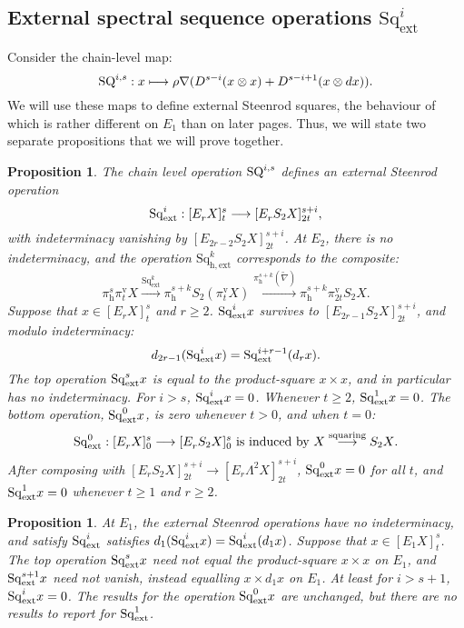 \documentclass[11pt]{amsart} \renewcommand{\baselinestretch}{1.4}
\theoremstyle{plain}
\newtheorem{prop}[thm]{Proposition}
\theoremstyle{definition}
\renewcommand{\to}{\longrightarrow}
\newcommand{\ExtCohOp}{\mathrm{Sq}_\mathrm{ext}}
\newcommand{\hExtCohOp}{\mathrm{Sq}_\mathrm{h,ext}}
\newcommand{\Nabla}{\nabla}
\newcommand{\Sq}{\mathrm{Sq}}
\newcommand{\Edownup}[5]{[E_{#1}^{#2}#3]^{#4}_{#5}}
\newcommand{\uver}{^\mathrm{v}}
\newcommand{\dhor}{_\mathrm{h}}
\renewcommand{\mapsto}{\longmapsto}
\begin{document}
\begin{second quadrant homotopy sseq operations}
\subsection{External spectral sequence operations $\Sq_\mathrm{ext}^i$}
\label{External spectral sequence operations Sq}
Consider the chain-level map:
\[\textup{SQ}^{i,s}:x\mapsto \rho\Nabla (D^{s-i}(x\otimes x)+D^{s-i+1}(x\otimes dx)).\]
We will use these maps to define external Steenrod squares, the behaviour of which is rather different on $E_1$ than on later pages. Thus, we will state two separate propositions that we will prove together.
\begin{prop}
\label{prop on e1 steens 1}
The chain level operation $\textup{SQ}^{i,s}$ defines an \emph{external Steenrod operation} \[\Sq^i_\textup{ext}:\Edownup{r}{}{X}{s}{t}\to \Edownup{r}{}{S_2X}{s+i}{2t},\] with indeterminacy vanishing by $\Edownup{2r-2}{}{S_2X}{s+i}{2t}$. At $E_2$, there is no indeterminacy, and the operation $\hExtCohOp^k$ corresponds to the composite:
\[\pi\dhor^s\pi\uver_t X
\overset{\ExtCohOp^k}{\to} 
\pi\dhor^{s+k}S_2(\pi\uver_t X)
\overset{\pi\dhor^{s+k}(\widetilde{\nabla})}{\to}
\pi\dhor^{s+k}\pi\uver_{2t}S_2 X.
\]
Suppose that $x\in \Edownup{r}{}{X}{s}{t}$ and $r\geq2$. $\Sq^i_\textup{ext}x$ survives to $\Edownup{2r-1}{}{S_2X}{s+i}{2t}$, and modulo indeterminacy: \[d_{2r-1}(\Sq^i_\textup{ext}x)=\Sq^{i+r-1}_\textup{ext}(d_rx).\]
The top operation $\Sq^s_\textup{ext}x$ is equal to the product-square $x\times x$, and in particular has no indeterminacy. For $i>s$, $\Sq^i_\textup{ext}x=0$. Whenever $t\geq2$, $\Sq^1_\textup{ext}x=0$.  The bottom operation, $\Sq^0_\textup{ext}x$, is zero whenever $t>0$, and when $t=0$:
\[\Sq^0_\textup{ext}:\Edownup{r}{}{X}{s}{0}\to \Edownup{r}{}{S_2X}{s}{0}\textup{ is induced by $X\overset{\textup{squaring}}{\to}S_2X$}.\]
After composing with $\Edownup{r}{}{S_2X}{s+i}{2t}\to \Edownup{r}{}{\Lambda^2X}{s+i}{2t}$, $\Sq^0_\textup{ext}x=0$ for all $t$, and $\Sq^1_\textup{ext}x=0$ whenever $t\geq1$ and $r\geq2$.
\end{prop}


\begin{prop}
\label{prop on e1 steens 2}
At $E_1$, the external Steenrod operations have no indeterminacy, and satisfy $\Sq^i_\textup{ext}$ satisfies $d_{1}(\Sq^i_\textup{ext}x)=\Sq^{i}_\textup{ext}(d_1x)$. Suppose that $x\in \Edownup{1}{}{X}{s}{t}$.
The top operation $\Sq^s_\textup{ext}x$ \emph{need not} equal the product-square $x\times x$ on $E_1$, and
$\Sq^{s+1}_\textup{ext}x$ \emph{need not} vanish, instead equalling $x\times d_1x$ on $E_1$.
At least for $i>s+1$, $\Sq^i_\textup{ext}x=0$. The results for the operation $\Sq^0_\textup{ext}x$ are unchanged, but there are no results to report for $\Sq^{1}_\textup{ext}$.
\end{prop}




\end{second quadrant homotopy sseq operations}
\end{document}
